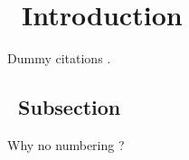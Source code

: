 \graphicspath{{images/}}

\section{\thesection~Introduction}
\label{sec:introduction}
Dummy \citet{Lawless2010} citations \citep{Heydari2016} \citep{Addinall2008}.

\subsection{\thesubsection~Subsection}

Why no numbering ?

